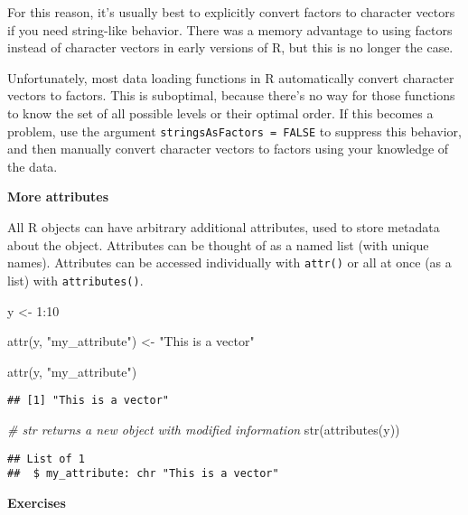 \documentclass[
]{book}
\newenvironment{Shaded}{\begin{snugshade}}{\end{snugshade}}
\newcommand{\CommentTok}[1]{\textcolor[rgb]{0.56,0.35,0.01}{\textit{#1}}}
\newcommand{\DecValTok}[1]{\textcolor[rgb]{0.00,0.00,0.81}{#1}}
\newcommand{\FunctionTok}[1]{\textcolor[rgb]{0.00,0.00,0.00}{#1}}
\newcommand{\NormalTok}[1]{#1}
\newcommand{\OtherTok}[1]{\textcolor[rgb]{0.56,0.35,0.01}{#1}}
\newcommand{\SpecialCharTok}[1]{\textcolor[rgb]{0.00,0.00,0.00}{#1}}
\newcommand{\StringTok}[1]{\textcolor[rgb]{0.31,0.60,0.02}{#1}}
\begin{document}
For this reason, it's usually best to explicitly convert factors to character vectors if you need string-like behavior. There was a memory advantage to using factors instead of character vectors in early versions of R, but this is no longer the case.

Unfortunately, most data loading functions in R automatically convert character vectors to factors. This is suboptimal, because there's no way for those functions to know the set of all possible levels or their optimal order. If this becomes a problem, use the argument \texttt{stringsAsFactors\ =\ FALSE} to suppress this behavior, and then manually convert character vectors to factors using your knowledge of the data.

\textbf{More attributes}

All R objects can have arbitrary additional attributes, used to store metadata about the object. Attributes can be thought of as a named list (with unique names). Attributes can be accessed individually with \texttt{attr()} or all at once (as a list) with \texttt{attributes()}.

\begin{Shaded}
\begin{Highlighting}[]
\NormalTok{y }\OtherTok{\textless{}{-}} \DecValTok{1}\SpecialCharTok{:}\DecValTok{10}

\FunctionTok{attr}\NormalTok{(y, }\StringTok{"my\_attribute"}\NormalTok{) }\OtherTok{\textless{}{-}} \StringTok{"This is a vector"}

\FunctionTok{attr}\NormalTok{(y, }\StringTok{"my\_attribute"}\NormalTok{)}
\end{Highlighting}
\end{Shaded}

\begin{verbatim}
## [1] "This is a vector"
\end{verbatim}

\begin{Shaded}
\begin{Highlighting}[]
\CommentTok{\# str returns a new object with modified information}
\FunctionTok{str}\NormalTok{(}\FunctionTok{attributes}\NormalTok{(y))}
\end{Highlighting}
\end{Shaded}

\begin{verbatim}
## List of 1
##  $ my_attribute: chr "This is a vector"
\end{verbatim}

\textbf{Exercises}
\end{document}

